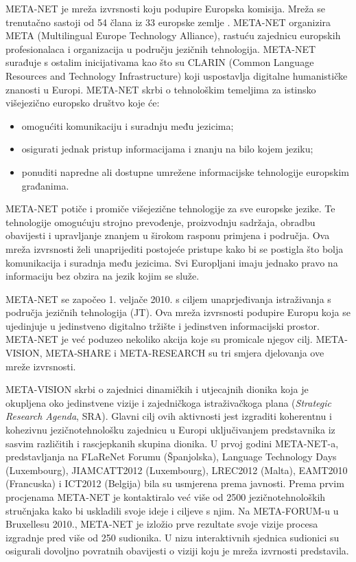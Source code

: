 \begin{multicols}{2}
META-NET je mreža izvrsnosti koju podupire Europska komisija. Mreža se trenutačno sastoji od 54 člana iz 33 europske zemlje \cite{art10}. META-NET organizira META (Multilingual Europe Technology Alliance), rastuću zajednicu europskih profesionalaca i organizacija u području jezičnih tehnologija. META-NET surađuje s ostalim inicijativama kao što su CLARIN (Common Language Resources and Technology Infrastructure) koji uspostavlja digitalne humanističke znanosti u Europi. META-NET skrbi o tehnološkim temeljima za istinsko višejezično europsko društvo koje će:

\begin{itemize}
\item omogućiti komunikaciju i suradnju među jezicima;
\item osigurati jednak pristup informacijama i znanju na bilo kojem jeziku;
\item ponuditi napredne ali dostupne umrežene informacijske tehnologije europskim građanima.
\end{itemize}

META-NET potiče i promiče višejezične tehnologije za sve europske jezike. Te tehnologije omogućuju strojno prevođenje, proizvodnju sadržaja, obradbu obavijesti i upravljanje znanjem u širokom rasponu primjena i područja. Ova mreža izvrsnosti želi unaprijediti postojeće pristupe kako bi se postigla što bolja komunikacija i suradnja među jezicima. Svi Europljani imaju jednako pravo na informaciju bez obzira na jezik kojim se služe.

META-NET se započeo 1. veljače 2010. s ciljem unaprjeđivanja istraživanja s područja jezičnih tehnologija (JT). Ova mreža izvrsnosti podupire Europu koja se ujedinjuje u jedinstveno digitalno tržište i jedinstven informacijski prostor. META-NET je već poduzeo nekoliko akcija koje su promicale njegov cilj. META-VISION, META-SHARE i META-RESEARCH su tri smjera djelovanja ove mreže izvrsnosti.

META-VISION skrbi o zajednici dinamičkih i utjecajnih dionika koja je okupljena oko jedinstvene vizije i zajedničkoga istraživačkoga plana (\emph{Strategic Research Agenda}, SRA). Glavni cilj ovih aktivnosti jest izgraditi koherentnu i kohezivnu jezičnotehnološku zajednicu u Europi uključivanjem predstavnika iz sasvim različitih i rascjepkanih skupina dionika. U prvoj godini META-NET-a, predstavljanja na FLaReNet Forumu (Španjolska), Language Technology Days (Luxembourg), JIAMCATT2012 (Luxembourg), LREC2012 (Malta), EAMT2010 (Francuska) i ICT2012 (Belgija) bila su usmjerena prema javnosti. Prema prvim procjenama META-NET je kontaktiralo već više od 2500 jezičnotehnoloških stručnjaka kako bi uskladili svoje ideje i ciljeve s njim. Na META-FORUM-u u Bruxellesu 2010., META-NET je izložio prve rezultate svoje vizije procesa izgradnje pred više od 250 sudionika. U nizu interaktivnih sjednica sudionici su osigurali dovoljno povratnih obavijesti o viziji koju je mreža izvrnosti predstavila.


\end{multicols}
